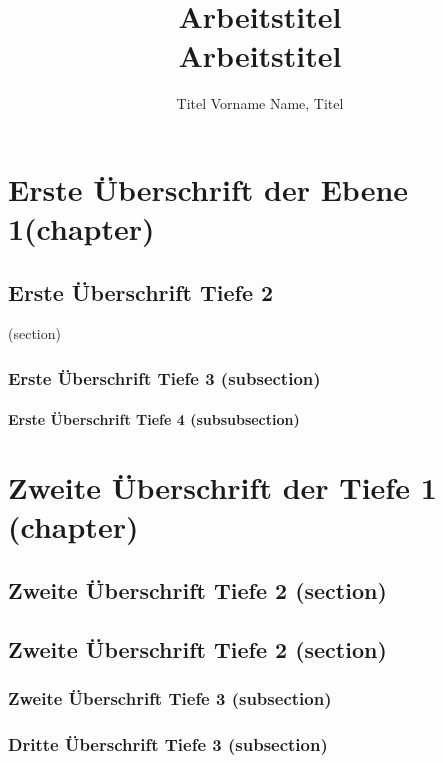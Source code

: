 \documentclass[Bachelor, BBE, german]{twbook}
\title{Arbeitstitel\\Arbeitstitel}
\author{Titel Vorname Name, Titel}
\begin{document}
\maketitle

\Blinddocument

\chapter{Erste Überschrift der Ebene 1(chapter)}
\blinddocument

\blindmathpaper

\section{Erste Überschrift Tiefe 2}(section)
\blindtext 

\subsection{Erste Überschrift Tiefe 3 (subsection)}
\blindtext 

\subsubsection{Erste Überschrift Tiefe 4 (subsubsection)}
\blindtext

\chapter{Zweite Überschrift der Tiefe 1 (chapter)}
\blindtext  

\section{Zweite Überschrift Tiefe 2 (section)}
\blindtext  

\section{Zweite Überschrift Tiefe 2 (section)}
\blindtext 

\subsection{Zweite Überschrift Tiefe 3 (subsection)}
\blindtext 

\subsection{Dritte Überschrift Tiefe 3 (subsection)}
\blindtext 
 
\end{document}
